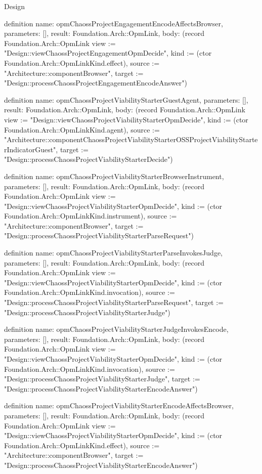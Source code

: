 \begin{lexlean}{Design}
\begin{semanticmodule}
definition{
  name: opmChaossProjectEngagementEncodeAffectsBrowser,
  parameters: [],
  result: Foundation.Arch::OpmLink,
  body: (record Foundation.Arch::OpmLink {view := "Design::viewChaossProjectEngagementOpmDecide", kind := (ctor Foundation.Arch::OpmLinkKind.effect), source := "Architecture::componentBrowser", target := "Design::processChaossProjectEngagementEncodeAnswer"})
}

definition{
  name: opmChaossProjectViabilityStarterGuestAgent,
  parameters: [],
  result: Foundation.Arch::OpmLink,
  body: (record Foundation.Arch::OpmLink {view := "Design::viewChaossProjectViabilityStarterOpmDecide", kind := (ctor Foundation.Arch::OpmLinkKind.agent), source := "Architecture::componentChaossProjectViabilityStarterOSSProjectViabilityStarterIndicatorGuest", target := "Design::processChaossProjectViabilityStarterDecide"})
}

definition{
  name: opmChaossProjectViabilityStarterBrowserInstrument,
  parameters: [],
  result: Foundation.Arch::OpmLink,
  body: (record Foundation.Arch::OpmLink {view := "Design::viewChaossProjectViabilityStarterOpmDecide", kind := (ctor Foundation.Arch::OpmLinkKind.instrument), source := "Architecture::componentBrowser", target := "Design::processChaossProjectViabilityStarterParseRequest"})
}

definition{
  name: opmChaossProjectViabilityStarterParseInvokesJudge,
  parameters: [],
  result: Foundation.Arch::OpmLink,
  body: (record Foundation.Arch::OpmLink {view := "Design::viewChaossProjectViabilityStarterOpmDecide", kind := (ctor Foundation.Arch::OpmLinkKind.invocation), source := "Design::processChaossProjectViabilityStarterParseRequest", target := "Design::processChaossProjectViabilityStarterJudge"})
}

definition{
  name: opmChaossProjectViabilityStarterJudgeInvokesEncode,
  parameters: [],
  result: Foundation.Arch::OpmLink,
  body: (record Foundation.Arch::OpmLink {view := "Design::viewChaossProjectViabilityStarterOpmDecide", kind := (ctor Foundation.Arch::OpmLinkKind.invocation), source := "Design::processChaossProjectViabilityStarterJudge", target := "Design::processChaossProjectViabilityStarterEncodeAnswer"})
}

definition{
  name: opmChaossProjectViabilityStarterEncodeAffectsBrowser,
  parameters: [],
  result: Foundation.Arch::OpmLink,
  body: (record Foundation.Arch::OpmLink {view := "Design::viewChaossProjectViabilityStarterOpmDecide", kind := (ctor Foundation.Arch::OpmLinkKind.effect), source := "Architecture::componentBrowser", target := "Design::processChaossProjectViabilityStarterEncodeAnswer"})
}


\end{semanticmodule}
\end{lexlean}
